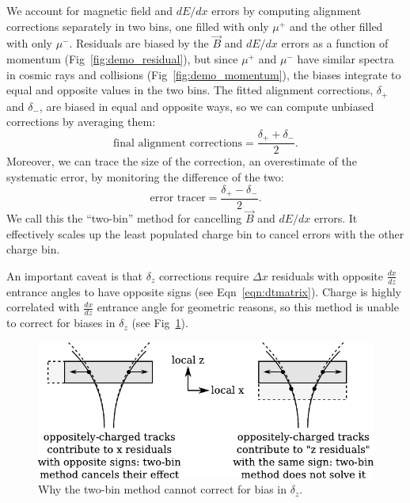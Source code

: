 \documentclass[12pt]{article}
\begin{document}
We account for magnetic field and $dE/dx$ errors by computing
alignment corrections separately in two bins, one filled with only
$\mu^+$ and the other filled with only $\mu^-$.  Residuals are biased
by the $\vec{B}$ and $dE/dx$ errors as a function of momentum
(Fig~\ref{fig:demo_residual}), but since $\mu^+$ and $\mu^-$ have
similar spectra in cosmic rays and collisions
(Fig~\ref{fig:demo_momentum}), the biases integrate to equal and opposite
values in the two bins.  The fitted alignment corrections, $\delta_+$
and $\delta_-$, are biased in equal and opposite ways, so we can
compute unbiased corrections by averaging them:
\begin{equation}
\mbox{final alignment corrections} = \frac{\delta_+ + \delta_-}{2} \mbox{.}
\end{equation}
Moreover, we can trace the size of the correction, an overestimate of
the systematic error, by monitoring the difference of the two:
\begin{equation}
\mbox{error tracer} = \frac{\delta_+ - \delta_-}{2} \mbox{.}
\end{equation}
We call this the ``two-bin'' method for cancelling $\vec{B}$ and
$dE/dx$ errors.  It effectively scales up the least populated charge
bin to cancel errors with the other charge bin.

An important caveat is that $\delta_z$ corrections require $\Delta x$
residuals with opposite $\frac{dx}{dz}$ entrance angles to have
opposite signs (see Eqn~\ref{eqn:dtmatrix}).  Charge is highly
correlated with $\frac{dx}{dz}$ entrance angle for geometric reasons,
so this method is unable to correct for biases in $\delta_z$ (see
Fig~\ref{fig:explanation_of_z}).

\begin{figure}
\begin{center}
\includegraphics{explanation_of_z.pdf}
\end{center}
\caption{Why the two-bin method cannot correct for bias in $\delta_z$.  \label{fig:explanation_of_z}}
\end{figure}
\end{document}
